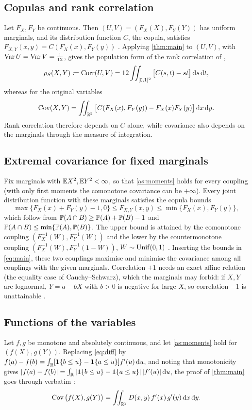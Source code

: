 \documentclass{saim-blog}
\begin{document}
\subsection{Copulas and rank correlation}
Let $F_X,F_Y$ be continuous. Then $(U,V)=(F_X(X),F_Y(Y))$ has uniform marginals, and its distribution function $C$, the copula, satisfies $F_{X,Y}(x,y)=C(F_X(x),F_Y(y))$ \citep[not proved here; see][]{sklar1959,nelsen2006}. Applying \cref{thm:main} to $(U,V)$, with $\operatorname{Var} U=\operatorname{Var} V=\tfrac1{12}$, gives the population form of the rank correlation of \citet{spearman1904},
\begin{equation}\label{eq:spearman}
\rho_S(X,Y)\coloneqq\operatorname{Corr}(U,V)=12\iint_{[0,1]^2}\big[C(s,t)-st\big]\mathop{}\!\mathrm{d} s\mathop{}\!\mathrm{d} t ,
\end{equation}
whereas for the original variables
\[
\operatorname{Cov}(X,Y)=\iint_{\mathbb{R}^2}\big[C(F_X(x),F_Y(y))-F_X(x)F_Y(y)\big]\mathop{}\!\mathrm{d} x\mathop{}\!\mathrm{d} y .
\]
Rank correlation therefore depends on $C$ alone, while covariance also depends on the marginals through the measure of integration.

\subsection{Extremal covariance for fixed marginals}
Fix marginals with $\mathbb{E} X^2,\mathbb{E} Y^2<\infty$, so that \cref{as:moments} holds for every coupling (with only first moments the comonotone covariance can be $+\infty$). Every joint distribution function with these marginals satisfies the copula bounds \citep{hoeffding1940,frechet1951}
\[
\max\{F_X(x)+F_Y(y)-1,0\}\le F_{X,Y}(x,y)\le\min\{F_X(x),F_Y(y)\},
\]
which follow from $\mathbb{P}(A\cap B)\ge\mathbb{P}(A)+\mathbb{P}(B)-1$ and $\mathbb{P}(A\cap B)\le\min\{\mathbb{P}(A),\mathbb{P}(B)\}$. The upper bound is attained by the comonotone coupling $(F_X^{-1}(W),F_Y^{-1}(W))$ and the lower by the countermonotone coupling $(F_X^{-1}(W),F_Y^{-1}(1-W))$, $W\sim\mathrm{Unif}(0,1)$ \citep[attainment not proved here; see][]{nelsen2006}. Inserting the bounds in \eqref{eq:main}, these two couplings maximise and minimise the covariance among all couplings with the given marginals. Correlation $\pm1$ needs an exact affine relation (the equality case of Cauchy--Schwarz), which the marginals may forbid: if $X,Y$ are lognormal, $Y=a-bX$ with $b>0$ is negative for large $X$, so correlation $-1$ is unattainable \citep{embrechts2002}.

\subsection{Functions of the variables}
Let $f,g$ be monotone and absolutely continuous, and let \cref{as:moments} hold for $(f(X),g(Y))$. Replacing \eqref{eq:diff} by $f(a)-f(b)=\int_{\mathbb{R}}[\mathbf{1}\{b\le u\}-\mathbf{1}\{a\le u\}]f'(u)\mathop{}\!\mathrm{d} u$, and noting that monotonicity gives $|f(a)-f(b)|=\int_{\mathbb{R}}|\mathbf{1}\{b\le u\}-\mathbf{1}\{a\le u\}|\,|f'(u)|\mathop{}\!\mathrm{d} u$, the proof of \cref{thm:main} goes through verbatim \citep{cuadras2002}:
\[
\operatorname{Cov}\big(f(X),g(Y)\big)=\iint_{\mathbb{R}^2}D(x,y)\,f'(x)\,g'(y)\mathop{}\!\mathrm{d} x\mathop{}\!\mathrm{d} y .
\]
\end{document}
